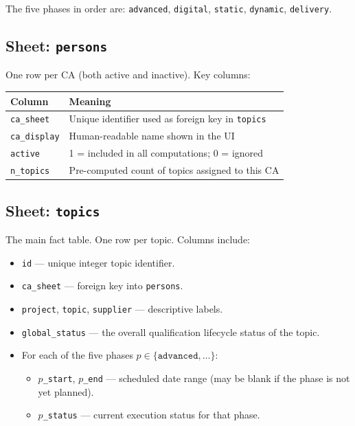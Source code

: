 \documentclass[12pt,a4paper]{report}
\begin{document}
The five phases in order are:
\texttt{advanced}, \texttt{digital}, \texttt{static}, \texttt{dynamic},
\texttt{delivery}.

\subsection{Sheet: \texttt{persons}}

One row per CA (both active and inactive). Key columns:

\begin{table}[H]
\centering
\begin{tabular}{@{} l l @{}}
\toprule
\textbf{Column} & \textbf{Meaning} \\
\midrule
\texttt{ca\_sheet}   & Unique identifier used as foreign key in \texttt{topics} \\
\texttt{ca\_display} & Human-readable name shown in the UI \\
\texttt{active}      & 1 = included in all computations; 0 = ignored \\
\texttt{n\_topics}   & Pre-computed count of topics assigned to this CA \\
\bottomrule
\end{tabular}
\end{table}

\subsection{Sheet: \texttt{topics}}

The main fact table. One row per topic. Columns include:

\begin{itemize}
  \item \texttt{id} --- unique integer topic identifier.
  \item \texttt{ca\_sheet} --- foreign key into \texttt{persons}.
  \item \texttt{project}, \texttt{topic}, \texttt{supplier} --- descriptive
        labels.
  \item \texttt{global\_status} --- the overall qualification lifecycle
        status of the topic.
  \item For each of the five phases $p \in \{\texttt{advanced},\ldots\}$:
    \begin{itemize}
      \item \texttt{$p$\_start}, \texttt{$p$\_end} --- scheduled date range
            (may be blank if the phase is not yet planned).
      \item \texttt{$p$\_status} --- current execution status for that
            phase.
    \end{itemize}
\end{itemize}
\end{document}
